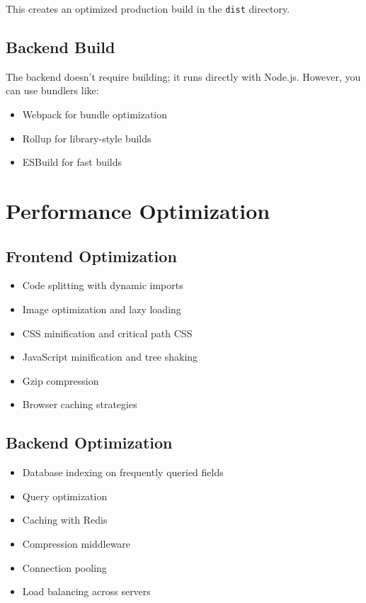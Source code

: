 This creates an optimized production build in the \texttt{dist} directory.

\subsection{Backend Build}

The backend doesn't require building; it runs directly with Node.js. However, you can use bundlers like:

\begin{itemize}
    \item Webpack for bundle optimization
    \item Rollup for library-style builds
    \item ESBuild for fast builds
\end{itemize}

\section{Performance Optimization}

\subsection{Frontend Optimization}

\begin{itemize}
    \item Code splitting with dynamic imports
    \item Image optimization and lazy loading
    \item CSS minification and critical path CSS
    \item JavaScript minification and tree shaking
    \item Gzip compression
    \item Browser caching strategies
\end{itemize}

\subsection{Backend Optimization}

\begin{itemize}
    \item Database indexing on frequently queried fields
    \item Query optimization
    \item Caching with Redis
    \item Compression middleware
    \item Connection pooling
    \item Load balancing across servers
\end{itemize}

